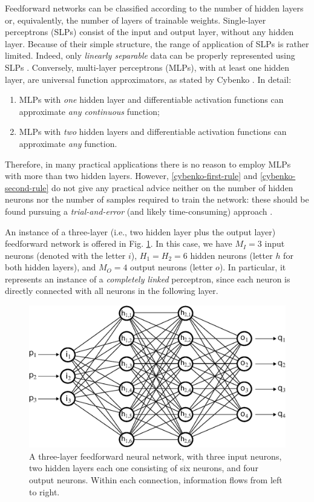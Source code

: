 \documentclass[longtitle]{elsarticle}
\numberwithin{equation}{section}
\theoremstyle{theorem}
\theoremstyle{definition}
\theoremstyle{remark}
\theoremstyle{proposition}
\numberwithin{figure}{section}
\begin{document}
		Feedforward networks can be classified according to the number of hidden layers or, equivalently, the number of layers of trainable weights. Single-layer perceptrons (SLPs) consist of the input and output layer, without any hidden layer. Because of their simple structure, the range of application of SLPs is rather limited. Indeed, only \emph{linearly separable} data can be properly represented using SLPs \cite{Kri07}. Conversely, multi-layer perceptrons (MLPs), with at least one hidden layer, are universal function approximators, as stated by Cybenko \cite{Cyb88, Cyb89}. In detail:
		\begin{enumerate}[label=(\roman*)]
			\item MLPs with \emph{one} hidden layer and differentiable activation functions can approximate \emph{any continuous} function; 
			\label{cybenko-first-rule}
			\item MLPs with \emph{two} hidden layers and differentiable activation functions can approximate \emph{any} function. 		
			\label{cybenko-second-rule}
		\end{enumerate}
		Therefore, in many practical applications there is no reason to employ MLPs with more than two hidden layers. However, \ref{cybenko-first-rule} and \ref{cybenko-second-rule} do not give any practical advice neither on the number of hidden neurons nor the number of samples required to train the network: these should be found pursuing a \emph{trial-and-error} (and likely time-consuming) approach \cite{Hag14}.
		
		An instance of a three-layer (i.e., two hidden layer plus the output layer) feedforward network is offered in Fig. \ref{fig:neural-network}. In this case, we have $M_I = 3$ input neurons (denoted with the letter $i$), $H_1 = H_2 = 6$ hidden neurons (letter $h$ for both hidden layers), and $M_O = 4$ output neurons (letter $o$). In particular, it represents an instance of a \emph{completely linked} perceptron, since each neuron is directly connected with all neurons in the following layer.
				
		\begin{figure}[t]
			\center
			\includegraphics[scale = 0.55]{neural_network_bis.eps}
			
			\caption{A three-layer feedforward neural network, with three input neurons, two hidden layers each one consisting of six neurons, and four output neurons. Within each connection, information flows from left to right.}
			\label{fig:neural-network}
		\end{figure}
		
\end{document}
